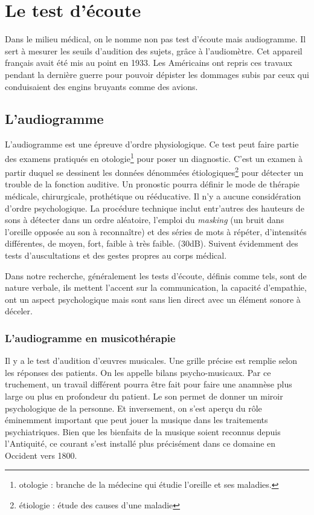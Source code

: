 \chapter{Le test d'écoute}

Dans le milieu médical, on le nomme non pas test d'écoute mais audiogramme. Il
sert à mesurer les seuils d'audition des sujets, grâce à l'audiomètre. Cet 
appareil français avait été mis au point en 1933. Les Américains
ont repris ces travaux pendant la dernière guerre pour pouvoir dépister
les dommages subis par ceux qui conduisaient des engins bruyants comme
des avions.

\section{L'audiogramme}

  L'audiogramme est une épreuve d'ordre physiologique. Ce test peut faire partie des examens  pratiqués en otologie\footnote{otologie : branche de la médecine
  	qui étudie l'oreille et ses maladies.} pour poser un diagnostic. 
   C'est un examen à partir duquel se
  dessinent les données dénommées étiologiques\footnote{étiologie : étude des causes
  	d'une maladie} pour détecter un trouble de la fonction auditive. Un pronostic pourra définir le mode de thérapie
médicale, chirurgicale, prothétique ou rééducative.
Il n'y a aucune considération d'ordre psychologique. La procédure technique inclut entr'autres des hauteurs de sons à détecter dans un ordre aléatoire, l'emploi du \emph{masking} (un bruit dans l'oreille opposée
au son à reconnaître) et des séries de
mots
à répéter, d'intensités différentes, de moyen,
fort, faible à très faible. (30dB). Suivent évidemment des tests d'auscultations et des gestes propres au corps médical. 

Dans notre recherche, généralement les tests d'écoute, définis comme tels, sont de nature verbale, ils mettent l'accent sur la communication, la capacité d'empathie, ont un aspect psychologique mais sont sans lien direct avec un élément sonore à déceler. 

\subsection{L'audiogramme en musicothérapie} 

 Il y a le test d'audition d'\oe uvres musicales. Une grille précise est remplie selon les réponses des patients. On les appelle bilans psycho-musicaux. Par ce truchement, un travail différent pourra être fait pour faire une anamnèse plus large ou plus en profondeur du patient. Le son permet de donner un miroir psychologique de la personne. Et inversement, on s'est aperçu du rôle éminemment important que peut jouer la musique dans les traitements psychiatriques. Bien que les bienfaits de la musique soient reconnus depuis l'Antiquité, ce courant s'est installé plus précisément dans ce domaine en Occident vers 1800.
 

